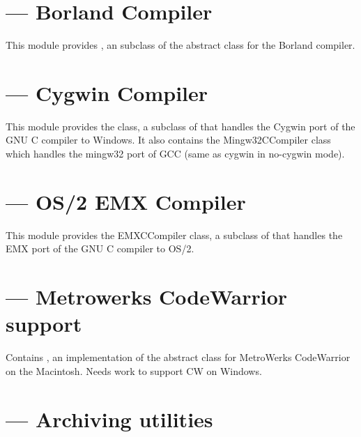 \documentclass{manual}
\begin{document}
\section{ --- Borland Compiler}
This module provides , an subclass of the abstract  class for the Borland \Cpp{} compiler.

\section{ --- Cygwin Compiler}

This module provides the  class, a subclass of  that
handles the Cygwin port of the GNU C compiler to Windows.  It also contains
the Mingw32CCompiler class which handles the mingw32 port of GCC (same as
cygwin in no-cygwin mode).

\section{ --- OS/2 EMX Compiler}

This module provides the EMXCCompiler class, a subclass of  that handles the EMX port of the GNU C compiler to OS/2.

\section{ --- Metrowerks CodeWarrior support}

Contains , an implementation of the abstract 
 class for MetroWerks CodeWarrior on the Macintosh. Needs work to support CW on Windows.


%

\section{ --- 
			Archiving utilities}
\end{document}
